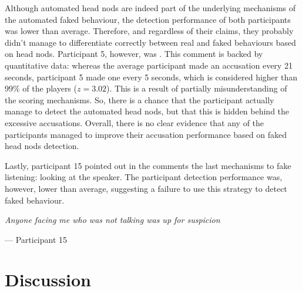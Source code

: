 \documentclass[]{simple-thesis}
\begin{document}
Although automated head nods are indeed part of the underlying mechanisms of the automated faked behaviour, the detection performance of both participants was lower than average.
Therefore, and regardless of their claims, they probably didn't manage to differentiate correctly between real and faked behaviours based on head nods.
Participant 5, however, was \textit{}.
This comment is backed by quantitative data: whereas the average participant made an accusation every 21 seconds, participant 5 made one every 5 seconds, which is considered higher than 99\% of the players ($z = 3.02$).
This is a result of partially misunderstanding of the scoring mechanisms.
So, there is a chance that the participant actually manage to detect the automated head nods, but that this is hidden behind the excessive accusations.
Overall, there is no clear evidence that any of the participants managed to improve their accusation performance based on faked head nods detection.

Lastly, participant 15 pointed out in the comments the last mechanisms to fake listening: looking at the speaker.
The participant detection performance was, however, lower than average, suggesting a failure to use this strategy to detect faked behaviour.

\begin{displayquote}
  \textit{Anyone facing me who was not talking was up for suspicion}

  \hfill
  --- Participant 15
\end{displayquote}

\section{Discussion}
\end{document}
